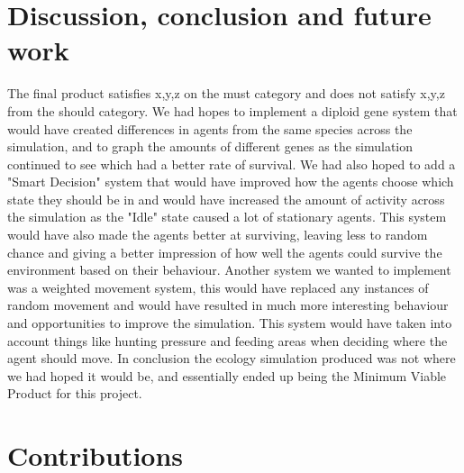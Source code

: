 \documentclass[a4paper, oneside, 11pt]{report}
\begin{document}
\chapter{Discussion, conclusion and future work}
	The final product satisfies x,y,z on the must category and does not satisfy x,y,z from the should category. We had hopes to implement a diploid gene system that would have created differences in agents from the same species across the simulation, and to graph the amounts of different genes as the simulation continued to see which had a better rate of survival. We had also hoped to add a "Smart Decision" system that would have improved how the agents choose which state they should be in and would have increased the amount of activity across the simulation as the "Idle" state caused a lot of stationary agents. This system would have also made the agents better at surviving, leaving less to random chance and giving a better impression of how well the agents could survive the environment based on their behaviour. Another system we wanted to implement was a weighted movement system, this would have replaced any instances of random movement and would have resulted in much more interesting behaviour and opportunities to improve the simulation. This system would have taken into account things like hunting pressure and feeding areas when deciding where the agent should move. In conclusion the ecology simulation produced was not where we had hoped it would be, and essentially ended up being the Minimum Viable Product for this project. 





\chapter*{Contributions}
\end{document}
